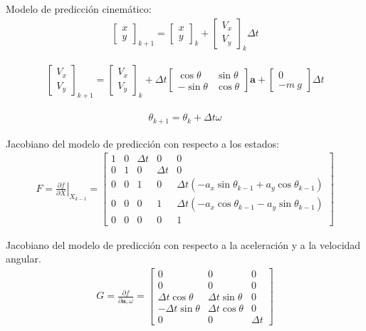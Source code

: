 Modelo de predicción cinemático:
\begin{align}
\begin{bmatrix} 
x \\ y 
\end{bmatrix}_{k+1}
=
\begin{bmatrix} 
x \\ y 
\end{bmatrix}_k
+
\begin{bmatrix} 
V_x \\ V_y 
\end{bmatrix}_k
\Delta t
\end{align}

\begin{align}
\begin{bmatrix} 
V_x \\ V_y 
\end{bmatrix}_{k+1}
=
\begin{bmatrix} 
V_x \\ V_y 
\end{bmatrix}_k + 
\Delta t
\begin{bmatrix} 
\cos{\theta} & \sin{\theta} \\ -\sin{\theta} & \cos{\theta}
\end{bmatrix}
\bm{a} +  
\begin{bmatrix} 
0 \\ - m\ g 
\end{bmatrix}\Delta t
\end{align}

\begin{align}
\theta_{k+1} = \theta_k + \Delta t \omega
\end{align}


Jacobiano del modelo de predicción con respecto a los estados:
\begin{align}
F =\left. \frac{\partial f}{\partial X}\right| _{X_{k-1}} =  
\begin{bmatrix} 
1 	&0	&\Delta t	&0		&0\\
0 	&1	&0		&\Delta t	&0\\
0 	&0	&1		&0		&\Delta t\left(-a_x\sin{\theta_{k-1}} + a_y\cos{\theta_{k-1}}\right) \\
0 	&0	&0		&1		&\Delta t\left(-a_x\cos{\theta_{k-1}} - a_y\sin{\theta_{k-1}}\right) \\
0 	&0	&0		&0		&1
\end{bmatrix}
\end{align}

Jacobiano del modelo de predicción con respecto a la aceleración y a la velocidad angular. 
\begin{align}
G =  \frac{\partial f}{\partial \bm{a},\omega} = 
\begin{bmatrix} 
0 			&0			&0\\
0 			&0			&0\\
\Delta t \cos{\theta} 	&\Delta t \sin{\theta}	&0\\
-\Delta t \sin{\theta} 	&\Delta t \cos{\theta}	&0\\
0 			&0			&\Delta t		
\end{bmatrix}
\end{align}

